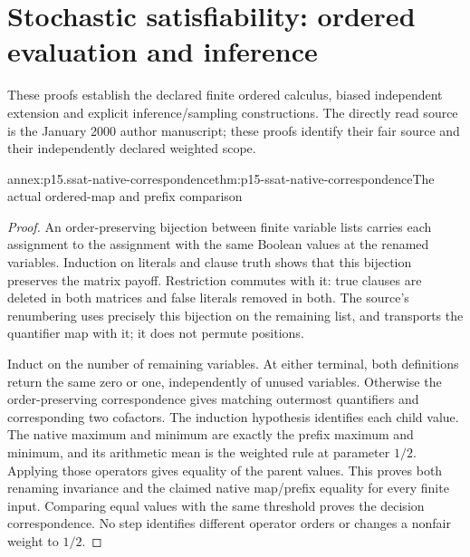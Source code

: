 \section{Stochastic satisfiability: ordered evaluation and inference}
\label{sec:p15-ssat-annex}

These proofs establish the declared finite ordered calculus, biased
independent extension and explicit inference/sampling constructions.
The directly read source is the January 2000 author manuscript; these
proofs identify their fair source and their independently declared weighted scope.

\begin{annexitem}{annex:p15.ssat-native-correspondence}{thm:p15-ssat-native-correspondence}{The actual ordered-map and prefix comparison}
\begin{proof}
An order-preserving bijection between finite variable lists carries each
assignment to the assignment with the same Boolean values at the renamed
variables. Induction on literals and clause truth shows that this bijection
preserves the matrix payoff. Restriction commutes with it: true clauses
are deleted in both matrices and false literals removed in both. The
source's renumbering uses precisely this bijection on the remaining list,
and transports the quantifier map with it; it does not permute positions.

Induct on the number of remaining variables. At either terminal, both
definitions return the same zero or one, independently of unused variables.
Otherwise the order-preserving correspondence gives matching outermost
quantifiers and corresponding two cofactors. The induction hypothesis
identifies each child value. The native maximum and minimum are exactly
the prefix maximum and minimum, and its arithmetic mean is the weighted
rule at parameter \(1/2\). Applying those operators gives equality of the
parent values. This proves both renaming invariance and the claimed native
map/prefix equality for every finite input. Comparing equal values with
the same threshold proves the decision correspondence. No step identifies
different operator orders or changes a nonfair weight to \(1/2\).
\end{proof}
\end{annexitem}

